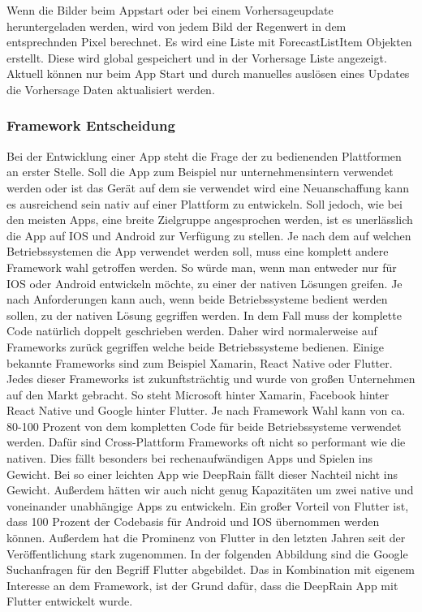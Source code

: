 Wenn die Bilder beim Appstart oder bei einem Vorhersageupdate heruntergeladen werden, wird von jedem Bild der Regenwert in dem entsprechnden Pixel berechnet. Es wird eine Liste mit ForecastListItem Objekten erstellt. Diese wird global gespeichert und in der Vorhersage Liste angezeigt. Aktuell können nur beim App Start und durch manuelles auslösen eines Updates die Vorhersage Daten aktualisiert werden.   

\subsubsection{Framework Entscheidung}\label{framework entscheidung}
Bei der Entwicklung einer App steht die Frage der zu bedienenden Plattformen an erster Stelle. Soll die App zum Beispiel nur unternehmensintern verwendet werden oder ist das Gerät auf dem sie verwendet wird eine Neuanschaffung kann es ausreichend sein nativ auf einer Plattform zu entwickeln. Soll jedoch, wie bei den meisten Apps, eine breite Zielgruppe angesprochen werden, ist es unerlässlich die App auf IOS und Android zur Verfügung zu stellen. Je nach dem auf welchen Betriebssystemen die App verwendet werden soll, muss eine komplett andere Framework wahl getroffen werden. So würde man, wenn man entweder nur für IOS oder Android entwickeln möchte, zu einer der nativen Lösungen greifen. Je nach Anforderungen kann auch, wenn beide Betriebssysteme bedient werden sollen, zu der nativen Lösung gegriffen werden. In dem Fall muss der komplette Code natürlich doppelt geschrieben werden. Daher wird normalerweise auf Frameworks zurück gegriffen welche beide Betriebssysteme bedienen. Einige bekannte Frameworks sind zum Beispiel Xamarin, React Native oder Flutter. Jedes dieser Frameworks ist zukunftsträchtig und wurde von großen Unternehmen auf den Markt gebracht. So steht Microsoft hinter Xamarin, Facebook hinter React Native und Google hinter Flutter. Je nach Framework Wahl kann von ca. 80-100 Prozent von dem kompletten Code für beide Betriebssysteme verwendet werden. Dafür sind Cross-Plattform Frameworks oft nicht so performant wie die nativen. Dies fällt besonders bei rechenaufwändigen Apps und Spielen ins Gewicht. Bei so einer leichten App wie DeepRain fällt dieser Nachteil nicht ins Gewicht. Außerdem hätten wir auch nicht genug Kapazitäten um zwei native und voneinander unabhängige Apps zu entwickeln. 
Ein großer Vorteil von Flutter ist, dass 100 Prozent der Codebasis für Android und IOS übernommen werden können. Außerdem hat die Prominenz von Flutter in den letzten Jahren seit der Veröffentlichung stark zugenommen. In der folgenden Abbildung sind die Google Suchanfragen für den Begriff Flutter abgebildet.  Das in Kombination mit eigenem Interesse an dem Framework, ist der Grund dafür, dass die DeepRain App mit Flutter entwickelt wurde. 

